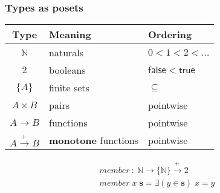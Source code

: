 \documentclass{beamer}
\newcommand{\mto}{\overset{\textbf{+}\:}{\to}}
\newcommand{\ms}{\mathsf}
\begin{document}
\begin{frame}
  \frametitle{Types as posets}
  \large
  \begin{center}
    \begin{tabular}{cll}
      \textbf{Type} & \textbf{Meaning} & \textbf{Ordering}
      \\\hline
      $\mathbb{N}$ & naturals & $0 < 1 < 2 < \hdots$\\
      $2$ & booleans & $\ms{false} < \ms{true}$\\
      $\{A\}$      & finite sets & ${\subseteq}$\\
      $A \times B$ & pairs & pointwise\\
      $A \to B$    & functions & pointwise\\
      $A \mto B$  & \textbf{monotone} functions & pointwise\\
    \end{tabular}
  \end{center}

  \vspace{0.75em}\pause

  \[\begin{array}{l}
    member ~:~ \mathbb{N} \to \{\mathbb{N}\} \mto 2\\
    member\; x\; \mathbf{s} = \exists(y \in \mathbf{s})\; x = y
  \end{array}\]

  \vspace{5em}

\end{frame}
\end{document}
